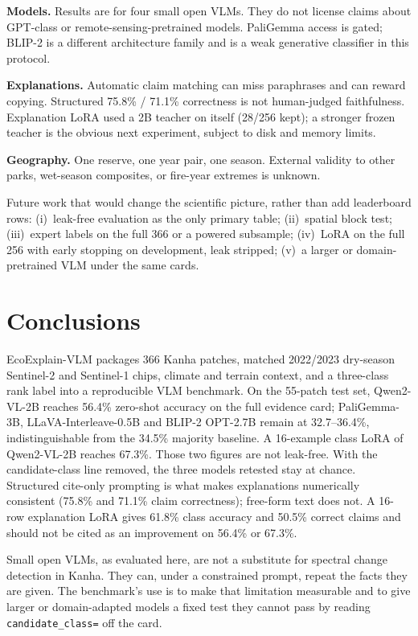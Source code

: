\documentclass[11pt]{article}
\begin{document}
\textbf{Models.} Results are for four small open VLMs. They do not
license claims about GPT-class or remote-sensing-pretrained models.
PaliGemma access is gated; BLIP-2 is a different architecture family
and is a weak generative classifier in this protocol.

\textbf{Explanations.} Automatic claim matching can miss paraphrases
and can reward copying. Structured 75.8\% / 71.1\% correctness is
not human-judged faithfulness. Explanation LoRA used a 2B teacher on
itself (28/256 kept); a stronger frozen teacher is the obvious next
experiment, subject to disk and memory limits.

\textbf{Geography.} One reserve, one year pair, one season. External
validity to other parks, wet-season composites, or fire-year extremes
is unknown.

Future work that would change the scientific picture, rather than
add leaderboard rows: (i)~leak-free evaluation as the only primary
table; (ii)~spatial block test; (iii)~expert labels on the full 366
or a powered subsample; (iv)~LoRA on the full 256 with early
stopping on development, leak stripped; (v)~a larger or
domain-pretrained VLM under the same cards.


\section{Conclusions}

EcoExplain-VLM packages 366 Kanha patches, matched 2022/2023
dry-season Sentinel-2 and Sentinel-1 chips, climate and terrain
context, and a three-class rank label into a reproducible VLM
benchmark. On the 55-patch test set, Qwen2-VL-2B reaches 56.4\%
zero-shot accuracy on the full evidence card; PaliGemma-3B,
LLaVA-Interleave-0.5B and BLIP-2 OPT-2.7B remain at 32.7--36.4\%,
indistinguishable from the 34.5\% majority baseline. A 16-example
class LoRA of Qwen2-VL-2B reaches 67.3\%. Those two figures are not
leak-free. With the candidate-class line removed, the three models
retested stay at chance. Structured cite-only prompting is what
makes explanations numerically consistent (75.8\% and 71.1\% claim
correctness); free-form text does not. A 16-row explanation LoRA
gives 61.8\% class accuracy and 50.5\% correct claims and should
not be cited as an improvement on 56.4\% or 67.3\%.

Small open VLMs, as evaluated here, are not a substitute for
spectral change detection in Kanha. They can, under a constrained
prompt, repeat the facts they are given. The benchmark's use is to
make that limitation measurable and to give larger or
domain-adapted models a fixed test they cannot pass by reading
\texttt{candidate\_class=} off the card.
\end{document}
